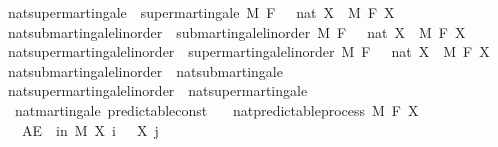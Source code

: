 \begin{isabellebody}
\isamarkupfalse%
\ nat{\isacharunderscore}{\kern0pt}supermartingale\ {\isacharequal}{\kern0pt}\ supermartingale\ M\ F\ {\isachardoublequoteopen}{}\ {\isacharcolon}{\kern0pt}{\isacharcolon}{\kern0pt}\ nat{\isachardoublequoteclose}\ X\ \ M\ F\ X\isanewline
\isanewline
{}\isamarkupfalse%
\ nat{\isacharunderscore}{\kern0pt}submartingale{\isacharunderscore}{\kern0pt}linorder\ {\isacharequal}{\kern0pt}\ submartingale{\isacharunderscore}{\kern0pt}linorder\ M\ F\ {\isachardoublequoteopen}{}\ {\isacharcolon}{\kern0pt}{\isacharcolon}{\kern0pt}\ nat{\isachardoublequoteclose}\ X\ \ M\ F\ X\isanewline
{}\isamarkupfalse%
\ nat{\isacharunderscore}{\kern0pt}supermartingale{\isacharunderscore}{\kern0pt}linorder\ {\isacharequal}{\kern0pt}\ supermartingale{\isacharunderscore}{\kern0pt}linorder\ M\ F\ {\isachardoublequoteopen}{}\ {\isacharcolon}{\kern0pt}{\isacharcolon}{\kern0pt}\ nat{\isachardoublequoteclose}\ X\ \ M\ F\ X\isanewline
\isanewline
{}\isamarkupfalse%
\ nat{\isacharunderscore}{\kern0pt}submartingale{\isacharunderscore}{\kern0pt}linorder\ {\isasymsubseteq}\ nat{\isacharunderscore}{\kern0pt}submartingale%
\isadelimproof
\ %
\endisadelimproof
%
\isatagproof
\isacommand{{\isachardot}{\kern0pt}{\isachardot}{\kern0pt}}\isamarkupfalse%
%
\endisatagproof
{\isafoldproof}%
%
\isadelimproof
%
\endisadelimproof
\isanewline
{}\isamarkupfalse%
\ nat{\isacharunderscore}{\kern0pt}supermartingale{\isacharunderscore}{\kern0pt}linorder\ {\isasymsubseteq}\ nat{\isacharunderscore}{\kern0pt}supermartingale%
\isadelimproof
\ %
\endisadelimproof
%
\isatagproof
\isacommand{{\isachardot}{\kern0pt}{\isachardot}{\kern0pt}}\isamarkupfalse%
%
\endisatagproof
{\isafoldproof}%
%
\isadelimproof
%
\endisadelimproof
\isanewline
\isanewline
{}\isamarkupfalse%
\ {\isacharparenleft}{\kern0pt}\ nat{\isacharunderscore}{\kern0pt}martingale{\isacharparenright}{\kern0pt}\ predictable{\isacharunderscore}{\kern0pt}const{\isacharcolon}{\kern0pt}\isanewline
\ \ \ {\isachardoublequoteopen}nat{\isacharunderscore}{\kern0pt}predictable{\isacharunderscore}{\kern0pt}process\ M\ F\ X{\isachardoublequoteclose}\isanewline
\ \ \ {\isachardoublequoteopen}AE\ {\isasymxi}\ in\ M{\isachardot}{\kern0pt}\ X\ i\ {\isasymxi}\ {\isacharequal}{\kern0pt}\ X\ j\ {\isasymxi}{\isachardoublequoteclose}\isanewline
%
\isadelimproof
%
\endisadelimproof
%
\isatagproof
{}\isamarkupfalse%

\end{isabellebody}
